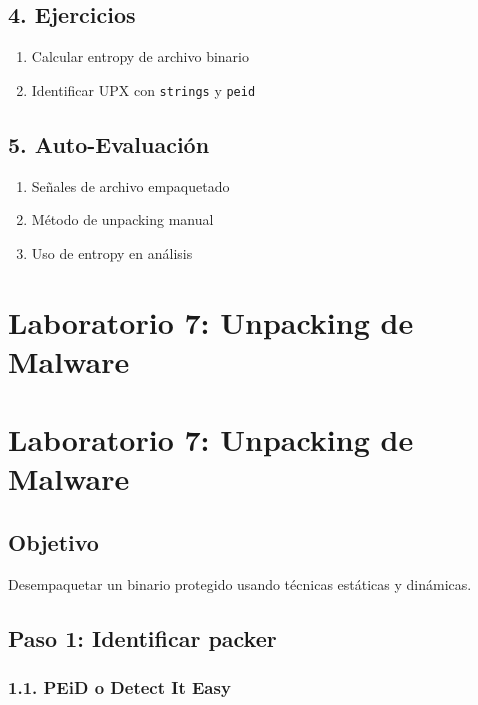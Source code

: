 \documentclass[
  letterpaper,
]{report}
\providecommand{\tightlist}{%
  \setlength{\itemsep}{0pt}\setlength{\parskip}{0pt}}
\begin{document}
\section{4. Ejercicios}\label{ejercicios-4}

\begin{enumerate}
\def\labelenumi{\arabic{enumi}.}
\tightlist
\item
  Calcular entropy de archivo binario
\item
  Identificar UPX con \texttt{strings} y \texttt{peid}
\end{enumerate}

\section{5. Auto-Evaluación}\label{auto-evaluaciuxf3n-6}

\begin{enumerate}
\def\labelenumi{\arabic{enumi}.}
\tightlist
\item
  Señales de archivo empaquetado
\item
  Método de unpacking manual
\item
  Uso de entropy en análisis
\end{enumerate}

\chapter{Laboratorio 7: Unpacking de
Malware}\label{laboratorio-7-unpacking-de-malware}

\chapter{Laboratorio 7: Unpacking de
Malware}\label{laboratorio-7-unpacking-de-malware-1}

\section{Objetivo}\label{objetivo-6}

Desempaquetar un binario protegido usando técnicas estáticas y
dinámicas.

\section{Paso 1: Identificar packer}\label{paso-1-identificar-packer}

\subsection{1.1. PEiD o Detect It Easy}\label{peid-o-detect-it-easy}
\end{document}
